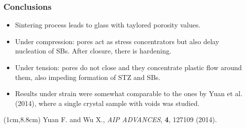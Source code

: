 \documentclass[12pt,t]{beamer}
\begin{document}


\begin{frame}
    \frametitle{Conclusions}
    \vspace{0.5cm}
    \begin{itemize}
        \item Sintering process leads to glass with taylored porosity values.
        \item Under compression: pores act as stress concentrators but also delay nucleation of SBs. After closure, there is hardening.
        \item Under tension: pores do not close and they concentrate plastic flow around them, also impeding formation of STZ and SBs.
        \item Results under strain were somewhat comparable to the ones by Yuan et al. (2014), where a single crystal sample with voids was studied.
    \end{itemize}
    \begin{textblock*}{12cm}(1cm,8.8cm) %
        \scriptsize{Yuan F. and Wu X., \textit{AIP ADVANCES}, \textbf{4}, 127109 (2014).}
    \end{textblock*}
\end{frame}
\end{document}
